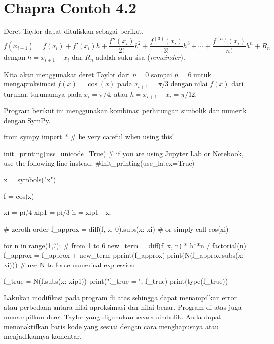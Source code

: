 \section{Chapra Contoh 4.2}

Deret Taylor dapat dituliskan sebagai berikut.
\begin{equation}
f(x_{i+1}) = f(x_{i}) + f'(x_{i}) h + \frac{f''(x_{i})}{2!}h^2 + 
\frac{f^{(3)}(x_{i})}{3!}h^3 + \cdots +
\frac{f^{(n)}(x_{i})}{n!}h^n + R_{n}
\end{equation}
dengan $h = x_{i+1} - x_{i}$ dan $R_{n}$ adalah suku sisa (\textit{remainder}).

Kita akan menggunakat deret Taylor dari $n=0$ sampai $n=6$ untuk mengaproksimasi
$f(x) = \cos(x)$ pada $x_{i+1} = \pi/3$ dengan nilai $f(x)$ dari turunan-turunannya
pada $x_{i} = \pi/4$, atau $h = x_{i+1} - x_{i} = \pi/12$.

Program berikut ini menggunakan kombinasi perhitungan simbolik dan numerik
dengan SymPy.
\begin{pythoncode}
from sympy import * # be very careful when using this!

init_printing(use_unicode=True)
# if you are using Jupyter Lab or Notebook, use the following line instead:
#init_printing(use_latex=True)

x = symbols("x")

f = cos(x)

xi = pi/4
xip1 = pi/3
h = xip1 - xi

# zeroth order
f_approx = diff(f, x, 0).subs({x: xi}) # or simply call cos(xi)

for n in range(1,7): # from 1 to 6
  new_term = diff(f, x, n) * h**n / factorial(n)
  f_approx = f_approx + new_term
  pprint(f_approx)
  print(N(f_approx.subs({x: xi}))) # use N to force numerical expression

f_true = N(f.subs({x: xip1}))
print("f_true = ", f_true)
print(type(f_true))
\end{pythoncode}


\begin{soal}
Lakukan modifikasi pada program di atas sehingga dapat menampilkan error atau
perbedaan antara nilai aproksimasi dan nilai benar. Program di atas juga menampilkan
deret Taylor yang digunakan secara simbolik. Anda dapat menonaktifkan baris
kode yang sesuai dengan cara menghapusnya atau menjadikannya komentar.
\end{soal}
